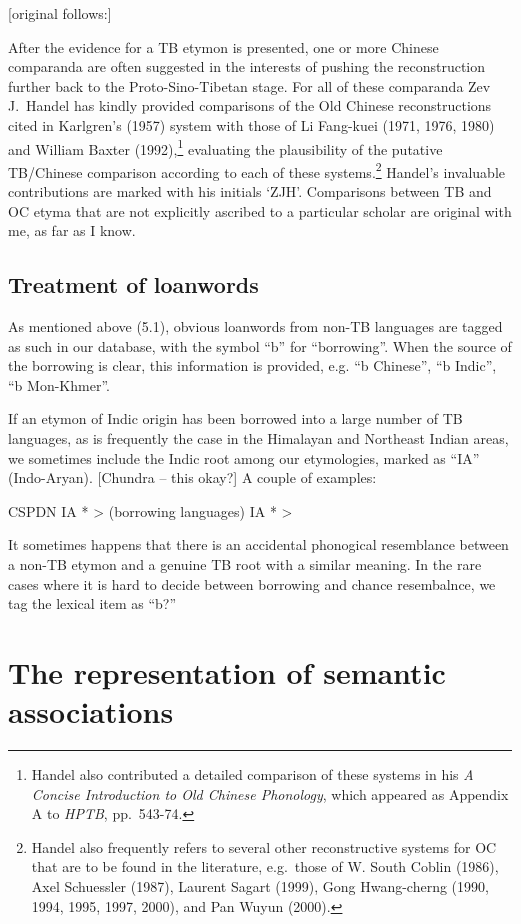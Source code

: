 [original follows:]

After the evidence for a TB etymon is presented, one or more Chinese
comparanda are often suggested in the interests of pushing the reconstruction
further back to the Proto-Sino-Tibetan stage.  For all of these comparanda
Zev J.\ Handel has kindly provided comparisons of the Old Chinese reconstructions cited
in Karlgren’s (1957) system with those of Li Fang-kuei (1971, 1976, 1980) and
William Baxter (1992),\footnote{Handel also contributed a detailed comparison
of these systems in his \textit{A Concise Introduction to Old Chinese Phonology},
which appeared as Appendix A to \textit{HPTB}, pp.~543-74.}
evaluating the plausibility of the
putative TB/Chinese comparison according to each of these systems.\footnote{Handel  also frequently refers to several other reconstructive systems for OC that are to be found
in the literature, e.g.\ those of W. South Coblin (1986), Axel Schuessler (1987),
Laurent Sagart (1999), Gong Hwang-cherng (1990, 1994, 1995, 1997, 2000), and Pan
Wuyun (2000).}   Handel’s invaluable contributions are marked with his initials ‘ZJH’. 
Comparisons between TB and OC etyma that are not explicitly ascribed to a
particular scholar are original with me, as far as I know.


\subsection{Treatment of loanwords}

As mentioned above (5.1), obvious loanwords from non-TB languages are tagged as such in our database, with the symbol “b” for “borrowing”. When the source of the borrowing is clear, this information is provided, e.g. “b Chinese”, “b Indic”, “b Mon-Khmer”. 

If an etymon of Indic origin has been borrowed into a large number of TB languages, as is frequently the case in the Himalayan and Northeast Indian areas, we sometimes include the Indic root among our etymologies, marked as “IA” (Indo-Aryan). [Chundra – this okay?] A couple of examples:

CSPDN
IA *	> (borrowing languages)
IA *	>

It sometimes happens that there is an accidental phonogical resemblance between a non-TB etymon and a genuine TB root with a similar meaning. In the rare cases where it is hard to decide between borrowing and chance resembalnce, we tag the lexical item as “b?”

\section{The representation of semantic associations}

